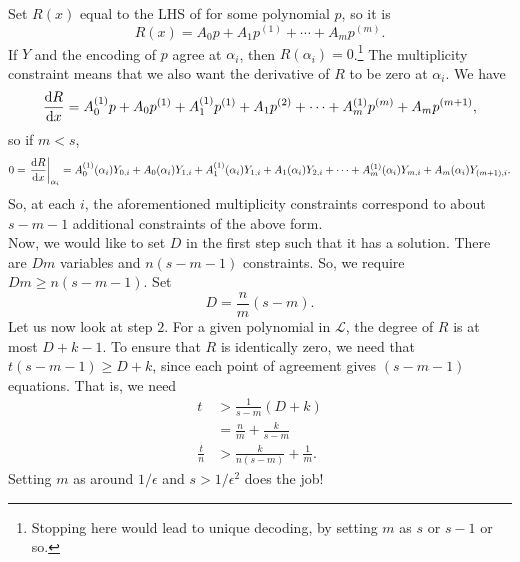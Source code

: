 \documentclass{article}
\newcommand{\restr}[2]{\ensuremath{\left.#1\right|_{#2}}}
\begin{document}
	Set $R(x)$ equal to the LHS of  for some polynomial $p$, so it is
	\[ R(x) = A_0p + A_1p^{(1)} + \cdots + A_m p^{(m)}. \]
	If $Y$ and the encoding of $p$ agree at $\alpha_i$, then $R(\alpha_i) = 0$.\footnote{Stopping here would lead to unique decoding, by setting $m$ as $s$ or $s-1$ or so.} The multiplicity constraint means that we also want the derivative of $R$ to be zero at $\alpha_i$. We have
	\[ \frac{\dif R}{\dif x} = A_0^{(1)}p + A_0p^{(1)} + A_1^{(1)}p^{(1)} + A_1p^{(2)} + \cdots + A_m^{(1)}p^{(m)} + A_mp^{(m+1)}, \]
	so if $m < s$,
	\[ 0 = \restr{\frac{\dif R}{\dif x}}{\alpha_i} = A_0^{(1)}(\alpha_i)Y_{0,i} + A_0(\alpha_i)Y_{1,i} + A_1^{(1)}(\alpha_i)Y_{1,i} + A_1(\alpha_i)Y_{2,i} + \cdots + A_m^{(1)}(\alpha_i)Y_{m,i} + A_m(\alpha_i) Y_{(m+1),i}. \]
	So, at each $i$, the aforementioned multiplicity constraints correspond to about $s-m-1$ additional constraints of the above form.\\

	Now, we would like to set $D$ in the first step such that it has a solution. There are $Dm$ variables and $n(s-m-1)$ constraints. %
	So, we require $Dm \ge n(s-m-1)$. Set
	\[ D = \frac{n}{m}(s-m). \]
	Let us now look at step $2$. For a given polynomial in $\mathcal{L}$, the degree of $R$ is at most $D+k-1$. To ensure that $R$ is identically zero, we need that $t(s-m-1) \ge D+k$, since each point of agreement gives $(s-m-1)$ equations. That is, we need
	\begin{align*}
		t &> \frac{1}{s-m} (D+k) \\
			&= \frac{n}{m} + \frac{k}{s-m} \\
		\frac{t}{n} &> \frac{k}{n(s-m)} + \frac{1}{m}.
	\end{align*}
	Setting $m$ as around $1/\epsilon$ and $s > 1/\epsilon^2$ does the job!\\
\end{document}
